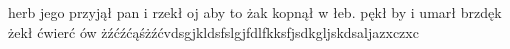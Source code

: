 \documentclass[12pt,a4paper]{book}
\author{
}
\title{
}
\begin{document}
\maketitle
herb jego przyjął pan i rzekł oj aby to żak kopnął w łeb. pękł by i umarł brzdęk żekł ćwierć ów
żźćźćąśżźćvdsgjkldsfslgjfdlfkksfjsdkgljskdsaljazxczxc
\end{document}
